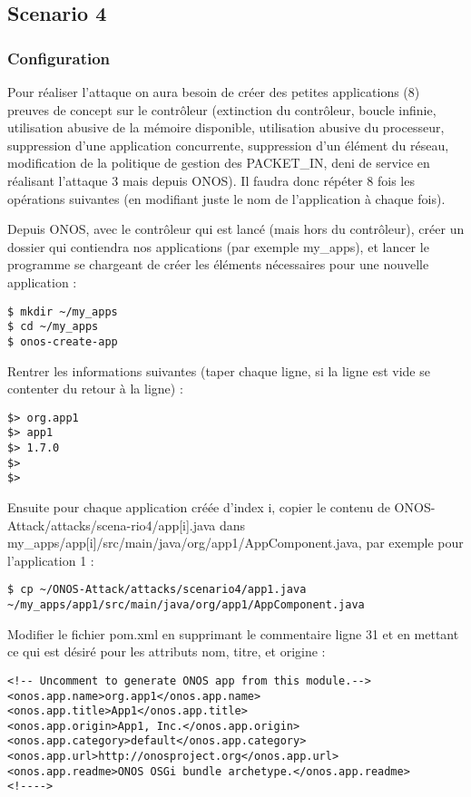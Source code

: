 \subsection{Scenario 4}

\subsubsection{Configuration}

Pour réaliser l'attaque on aura besoin de créer des petites applications (8) preuves de concept sur le contrôleur (extinction du contrôleur, boucle infinie, utilisation abusive de la mémoire disponible, utilisation abusive du processeur, suppression d'une application concurrente, suppression d'un élément du réseau, modification de la politique de gestion des PACKET\_IN, deni de service en réalisant l'attaque 3 mais depuis ONOS).
Il faudra donc répéter 8 fois les opérations suivantes (en modifiant juste le nom de l'application à chaque fois).

Depuis ONOS, avec le contrôleur qui est lancé (mais hors du contrôleur), créer un dossier qui contiendra nos applications (par exemple my\_apps), et lancer le programme se chargeant de créer les éléments nécessaires pour une nouvelle application :
\begin{verbatim}
$ mkdir ~/my_apps
$ cd ~/my_apps
$ onos-create-app
\end{verbatim}

Rentrer les informations suivantes (taper chaque ligne, si la ligne est vide se contenter du retour à la ligne) :
\begin{verbatim}
$> org.app1
$> app1
$> 1.7.0
$> 
$> 
\end{verbatim}

Ensuite pour chaque application créée d'index i, copier le contenu de ONOS-Attack/attacks/scena-rio4/app[i].java dans my\_apps/app[i]/src/main/java/org/app1/AppComponent.java, par exemple pour l'application 1 :

\begin{verbatim}
$ cp ~/ONOS-Attack/attacks/scenario4/app1.java
~/my_apps/app1/src/main/java/org/app1/AppComponent.java
\end{verbatim}

Modifier le fichier pom.xml en supprimant le commentaire ligne 31 et en mettant ce qui est désiré pour les attributs nom, titre, et origine :
\begin{verbatim}
<!-- Uncomment to generate ONOS app from this module.-->
<onos.app.name>org.app1</onos.app.name>
<onos.app.title>App1</onos.app.title>
<onos.app.origin>App1, Inc.</onos.app.origin>
<onos.app.category>default</onos.app.category>
<onos.app.url>http://onosproject.org</onos.app.url>
<onos.app.readme>ONOS OSGi bundle archetype.</onos.app.readme>
<!---->
\end{verbatim}

